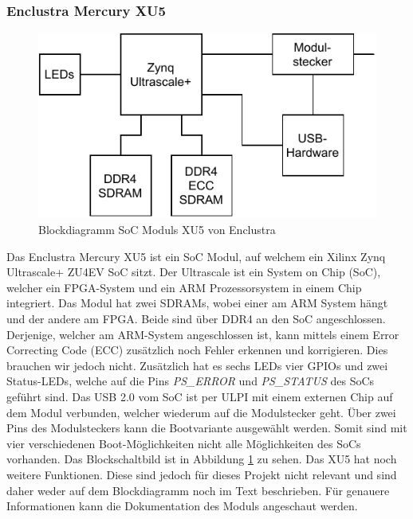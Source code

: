 \documentclass{article}
\begin{document}
\subsubsection*{Enclustra Mercury XU5}
\begin{figure}[tb]
    \includegraphics[width=\linewidth]{drawio/bd_xu5}
    \caption{Blockdiagramm SoC Moduls XU5 von Enclustra}
    \label{fig:bd_xu5}
\end{figure}
Das Enclustra Mercury XU5 ist ein SoC Modul, auf welchem ein Xilinx Zynq Ultrascale+ ZU4EV SoC sitzt. 
Der Ultrascale ist ein System on Chip (SoC), welcher ein FPGA-System und ein ARM Prozessorsystem in einem Chip integriert. 
Das Modul hat zwei SDRAMs, wobei einer am ARM System hängt und der andere am FPGA. Beide sind über DDR4 an den SoC angeschlossen. Derjenige, welcher am ARM-System angeschlossen ist, kann mittels einem Error Correcting Code (ECC) zusätzlich noch Fehler erkennen und korrigieren. Dies brauchen wir jedoch nicht. 
Zusätzlich hat es sechs LEDs vier GPIOs und zwei Status-LEDs, welche auf die Pins \textit{PS\_ERROR} und \textit{PS\_STATUS} des SoCs geführt sind. 
Das USB 2.0 vom SoC ist per ULPI mit einem externen Chip auf dem Modul verbunden, welcher wiederum auf die Modulstecker geht. Über zwei Pins des Modulsteckers kann die Bootvariante ausgewählt werden. Somit sind mit vier verschiedenen Boot-Möglichkeiten nicht alle Möglichkeiten des SoCs vorhanden.
Das Blockschaltbild ist in Abbildung \ref{fig:bd_xu5} zu sehen. Das XU5 hat noch weitere Funktionen. 
Diese sind jedoch für dieses Projekt nicht relevant und sind daher weder auf dem Blockdiagramm noch im Text beschrieben. 
Für genauere Informationen kann die Dokumentation des Moduls angeschaut werden. 
\end{document}
